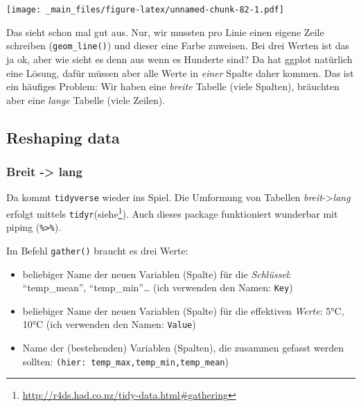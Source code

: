 \documentclass[]{book}
\newenvironment{Shaded}{\begin{snugshade}}{\end{snugshade}}
\newcommand{\KeywordTok}[1]{\textcolor[rgb]{0.13,0.29,0.53}{\textbf{#1}}}
\newcommand{\NormalTok}[1]{#1}
\newcommand{\OperatorTok}[1]{\textcolor[rgb]{0.81,0.36,0.00}{\textbf{#1}}}
\newcommand{\StringTok}[1]{\textcolor[rgb]{0.31,0.60,0.02}{#1}}
\providecommand{\tightlist}{%
  \setlength{\itemsep}{0pt}\setlength{\parskip}{0pt}}
\let\rmarkdownfootnote\footnote%
\def\footnote{\protect\rmarkdownfootnote}
\begin{document}
\texttt{[image: \_main\_files/figure-latex/unnamed-chunk-82-1.pdf]}

Das sieht schon mal gut aus. Nur, wir mussten pro Linie einen eigene Zeile schreiben (\texttt{geom\_line()}) und dieser eine Farbe zuweisen. Bei drei Werten ist das ja ok, aber wie sieht es denn aus wenn es Hunderte sind? Da hat ggplot natürlich eine Lösung, dafür müssen aber alle Werte in \emph{einer} Spalte daher kommen. Das ist ein häufiges Problem: Wir haben eine \emph{breite} Tabelle (viele Spalten), bräuchten aber eine \emph{lange} Tabelle (viele Zeilen).

\hypertarget{reshaping-data}{%
\subsection{Reshaping data}\label{reshaping-data}}

\hypertarget{breit---lang}{%
\subsubsection{Breit -\textgreater{} lang}\label{breit---lang}}

Da kommt \texttt{tidyverse} wieder ins Spiel. Die Umformung von Tabellen \emph{breit}-\textgreater{}\emph{lang} erfolgt mittels \texttt{tidyr}(siehe\footnote{\url{http://r4ds.had.co.nz/tidy-data.html\#gathering}}). Auch dieses package funktioniert wunderbar mit piping (\texttt{\%\textgreater{}\%}).

\begin{Shaded}
\end{Shaded}

Im Befehl \texttt{gather()} braucht es drei Werte:

\begin{itemize}
\tightlist
\item
  beliebiger Name der neuen Variablen (Spalte) für die \emph{Schlüssel}: ``temp\_mean'', ``temp\_min''\ldots{} (ich verwenden den Namen: \texttt{Key})
\item
  beliebiger Name der neuen Variablen (Spalte) für die effektiven \emph{Werte}: 5°C, 10°C (ich verwenden den Namen: \texttt{Value})
\item
  Name der (bestehenden) Variablen (Spalten), die zusammen gefasst werden sollten: \texttt{(hier:\ temp\_max,temp\_min,temp\_mean})
\end{itemize}
\end{document}
